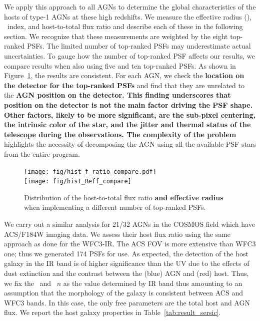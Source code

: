 \documentclass[apj]{emulateapj}
\begin{document}
We apply this approach to all AGNs to determine the global characteristics of the hosts of type-1 AGNs at these high redshifts. We measure the effective radius (\Reff), \sersic\ index, and host-to-total flux ratio and describe each of these in the following section. We recognize that these measurements are weighted by the eight top-ranked PSFs. The limited number of top-ranked PSFs may underestimate actual uncertainties. To gauge how the number of top-ranked PSF affects our results, we compare results when also using five and ten top-ranked PSFs. As shown in Figure~\ref{fig:hist_compare}, the results are consistent. For each AGN, we check the {\bf location on the detector for the top-ranked PSFs} and find that they are unrelated to the {\bf AGN position on the detector. This finding underscores that position on the detector is not the main factor driving the PSF shape. Other factors, likely to be more significant, are the sub-pixel centering, the intrinsic color of the star, and the jitter and thermal status of the telescope during the observations. The complexity of the problem}
highlights the necessity of decomposing the AGN using all the available PSF-stars from the entire program.

\begin{figure}
\centering
{
\texttt{[image: fig/hist\_f\_ratio\_compare.pdf]}\\
\texttt{[image: fig/hist\_Reff\_compare]}\\
}
\caption{\label{fig:hist_compare} 
Distribution of the host-to-total flux ratio {\bf and effective radius} when implementing a different number of top-ranked PSFs.}
\end{figure} 


We carry out a similar analysis for 21/32 AGNs in the COSMOS field which have ACS/F184W imaging data. We assess their host flux ratio using the same approach as done for the WFC3-IR. The ACS FOV is more extensive than WFC3 one; thus we generated 174 PSFs for use. As expected, the detection of the host galaxy in the IR band is of higher significance than the UV due to the effects of dust extinction and the contrast between the (blue) AGN and (red) host. Thus, we fix the \Reff\ and \sersic\ $n$ as the value determined by IR band thus amounting to an assumption that the morphology of the galaxy is consistent between ACS and WFC3 bands. In this case, the only free parameters are the total host and AGN flux. We report the host galaxy properties in Table~\ref{tab:result_sersic}.
\end{document}

